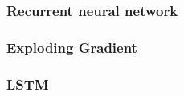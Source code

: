 
\subsubsection{Recurrent neural network}


\subsubsection{Exploding Gradient}


\subsubsection{LSTM}

